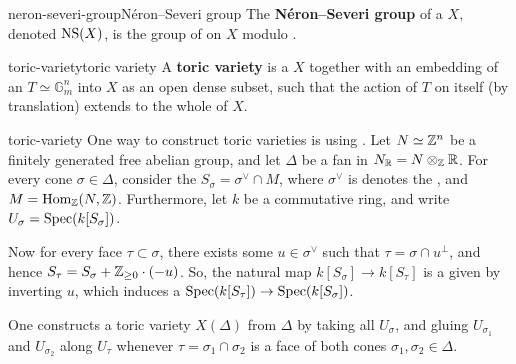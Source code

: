 \begin{topic}{neron-severi-group}{Néron--Severi group}
    The \textbf{Néron--Severi group} of a  $X$, denoted $\textup{NS}(X)$, is the group of  on $X$ modulo .
\end{topic}

\begin{topic}{toric-variety}{toric variety}
    A \textbf{toric variety} is a  $X$ together with an embedding of an  $T \simeq \mathbb{G}_m^n$ into $X$ as an open dense subset, such that the action of $T$ on itself (by translation) extends to the whole of $X$.
\end{topic}

\begin{example}{toric-variety}
    One way to construct toric varieties is using . Let $N \simeq \mathbb{Z}^n$ be a finitely generated free abelian group, and let $\Delta$ be a fan in $N_{\mathbb{R}} = N \otimes_{\mathbb{Z}} \mathbb{R}$. For every cone $\sigma \in \Delta$, consider the  $S_\sigma = \sigma^\vee \cap M$, where $\sigma^\vee$ is denotes the , and $M = \text{Hom}_{\mathbb{Z}}(N, \mathbb{Z})$. Furthermore, let $k$ be a commutative ring, and write $U_\sigma = \operatorname{Spec}(k[S_\sigma])$.
    
    Now for every face $\tau \subset \sigma$, there exists some $u \in \sigma^\vee$ such that $\tau = \sigma \cap u^\perp$, and hence $S_\tau = S_\sigma + \mathbb{Z}_{\ge 0} \cdot (-u)$. So, the natural map $k[S_\sigma] \to k[S_\tau]$ is a  given by inverting $u$, which induces a  $\operatorname{Spec}(k[S_\tau]) \to \operatorname{Spec}(k[S_\sigma])$.
    
    One constructs a toric variety $X(\Delta)$ from $\Delta$ by taking all $U_\sigma$, and gluing $U_{\sigma_1}$ and $U_{\sigma_2}$ along $U_\tau$ whenever $\tau = \sigma_1 \cap \sigma_2$ is a face of both cones $\sigma_1, \sigma_2 \in \Delta$.
    

\end{example}
